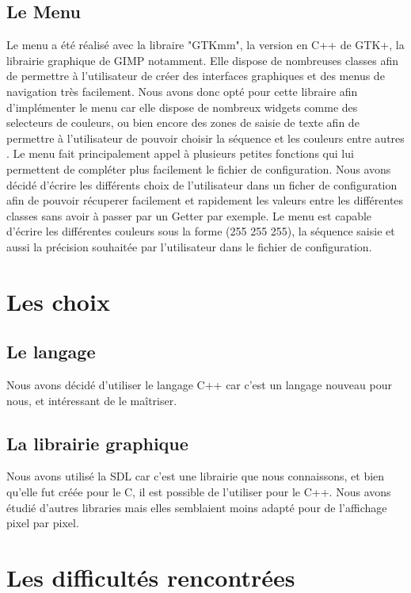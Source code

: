 \documentclass{article}
\begin{document}
    \subsection{Le Menu}
	Le menu a été réalisé avec la libraire "GTKmm", la version en C++ de GTK+, la librairie graphique de GIMP notamment.
	Elle dispose de nombreuses classes afin de permettre à l'utilisateur de créer des interfaces graphiques et des menus de navigation très facilement.
	Nous avons donc opté pour cette libraire afin d'implémenter le menu car elle dispose de nombreux widgets comme des selecteurs de couleurs, ou bien encore des zones de saisie de texte afin de permettre à l'utilisateur de pouvoir choisir la séquence et les couleurs entre autres .
	Le menu fait principalement appel à plusieurs petites fonctions qui lui permettent de compléter plus facilement le fichier de configuration.
	Nous avons décidé d'écrire les différents choix de l'utilisateur dans un ficher de configuration afin de pouvoir récuperer facilement et rapidement les valeurs entre les différentes classes sans avoir à passer par un Getter par exemple.
    Le menu est capable d'écrire les différentes couleurs sous la forme (255 255 255), la séquence saisie et aussi la précision souhaitée par l'utilisateur dans le fichier de configuration.

	\section{Les choix}

    \subsection{Le langage}
    Nous avons décidé d'utiliser le langage C++ car c'est un langage nouveau pour nous, et intéressant de le maîtriser.

    \subsection{La librairie graphique}
    Nous avons utilisé la SDL car c'est une librairie que nous connaissons, et bien qu'elle fut créée pour le C, il est possible de l'utiliser pour le C++.
    Nous avons étudié d'autres libraries mais elles semblaient moins adapté pour de l'affichage pixel par pixel.

	\section{Les difficultés rencontrées}
\end{document}
